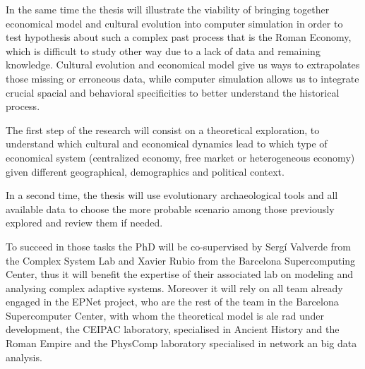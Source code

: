 \documentclass[a4paper]{article}
\begin{document}
In the same time the thesis will illustrate the viability of bringing together economical model and cultural evolution into computer simulation in order to test hypothesis about such a complex past process that is the Roman Economy, which is difficult to study other way due to a lack of data and remaining knowledge. Cultural evolution and economical model give us ways to extrapolates those missing or erroneous data, while computer simulation allows us to integrate crucial spacial and behavioral specificities to better understand the historical process.




The first step of the research will consist on a theoretical exploration, to understand which cultural and economical dynamics lead to which type of economical system (centralized economy, free market or heterogeneous economy) given different geographical, demographics and political context.

In a second time, the thesis will use evolutionary archaeological tools and all available data to choose the more probable scenario among those previously explored and review them if needed.

To succeed in those tasks the PhD will be co-supervised by Sergí Valverde from the Complex System Lab and Xavier Rubio from the Barcelona Supercomputing Center, thus it will benefit the expertise of their associated lab on modeling and analysing complex adaptive systems. Moreover it will rely on all team already engaged in the EPNet project, who are the rest of the team in the Barcelona Supercomputer Center, with whom the theoretical model is ale rad under development, the CEIPAC  laboratory, specialised in Ancient History and the Roman Empire and the PhysComp laboratory specialised in network an big data analysis.
\end{document}
